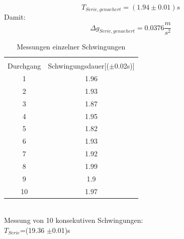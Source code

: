 \documentclass{article}
\begin{document}
\begin{equation}
T_{Serie,genaehert} = (1.94 \pm 0.01)s
\end{equation}
Damit:
\begin{equation}
\Delta g_{Serie,genaehert} = 0.0376 \frac{m}{s^2}
\end{equation}
\begin{table}
\caption{Messungen einzelner Schwingungen}
\begin{center}
\begin{tabular}{|c|c|}
\hline \\
Durchgang & Schwingungsdauer[($\pm$0.02s)]\\
\hline 1&1.96\\
\hline 2&1.93\\
\hline 3&1.87\\
\hline 4&1.95\\
\hline 5&1.82\\
\hline 6&1.93\\
\hline 7&1.92\\
\hline 8&1.99\\
\hline 9&1.9\\
\hline 10&1.97\\
\hline

\end{tabular} \\
\vspace{1cm}
Messung von 10 konsekutiven Schwingungen:\\
\vspace{1cm}
$T_{Serie}$=(19.36 $\pm$0.01)s
\end{center}
\end{table}
\end{document}

